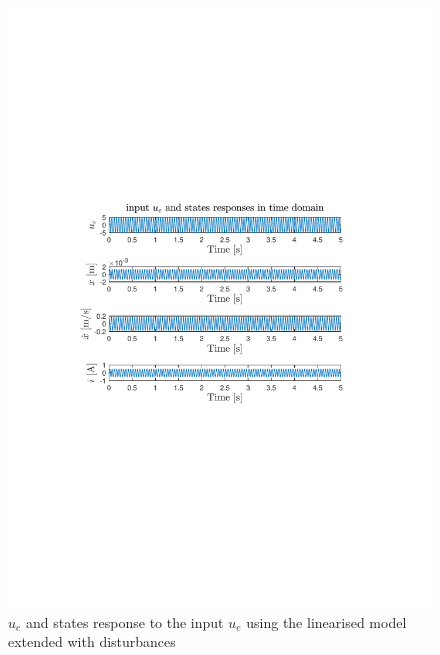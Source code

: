 \begin{figure}[H]
 \centering 
 \includegraphics[trim=2cm 7cm 2cm 7cm, clip=true, totalheight=0.35\textheight, angle=0]{figures/responseNoiset.pdf}
 \caption{$u_e$ and states response to the input $u_e$ using the linearised model extended with disturbances}
 \label{fig:responseNoiset}
\end{figure}

